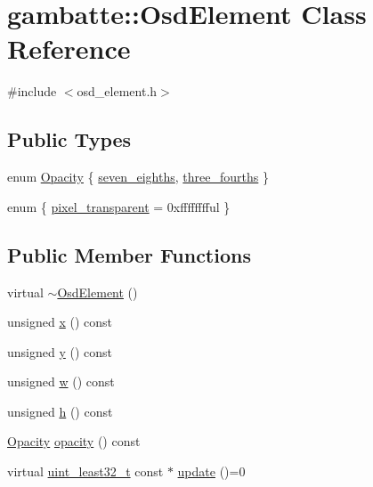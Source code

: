\hypertarget{classgambatte_1_1OsdElement}{}\section{gambatte\+:\+:Osd\+Element Class Reference}
\label{classgambatte_1_1OsdElement}


{\ttfamily \#include $<$osd\+\_\+element.\+h$>$}

\subsection*{Public Types}
\begin{DoxyCompactItemize}
\item 
enum \hyperlink{classgambatte_1_1OsdElement_a1e52ecfbc0d4337e1f2b38d6c4a97636}{Opacity} \{ \hyperlink{classgambatte_1_1OsdElement_a1e52ecfbc0d4337e1f2b38d6c4a97636a1f8c4eebdca1a18dff836db5d55de550}{seven\+\_\+eighths}, 
\hyperlink{classgambatte_1_1OsdElement_a1e52ecfbc0d4337e1f2b38d6c4a97636a167587e5da41c2d2d0da8e47bfd113f8}{three\+\_\+fourths}
 \}
\item 
enum \{ \hyperlink{classgambatte_1_1OsdElement_abac4885cdde352f8e7fa103b5ee55d9ba20e77644d4ab19a787a19b0e2653b6a8}{pixel\+\_\+transparent} = 0xfffffffful
 \}
\end{DoxyCompactItemize}
\subsection*{Public Member Functions}
\begin{DoxyCompactItemize}
\item 
virtual \hyperlink{classgambatte_1_1OsdElement_a39756e8cfb69dae634c0baaacdaa3796}{$\sim$\+Osd\+Element} ()
\item 
unsigned \hyperlink{classgambatte_1_1OsdElement_a76531a91472fdd9166a5536e1ff8f420}{x} () const
\item 
unsigned \hyperlink{classgambatte_1_1OsdElement_a5f0f2260752e7f2ebcc93b1007c5c0f7}{y} () const
\item 
unsigned \hyperlink{classgambatte_1_1OsdElement_ae7609268223e37561e634323cea5a467}{w} () const
\item 
unsigned \hyperlink{classgambatte_1_1OsdElement_a06b0891145ca9aac2d10cf9646681ce3}{h} () const
\item 
\hyperlink{classgambatte_1_1OsdElement_a1e52ecfbc0d4337e1f2b38d6c4a97636}{Opacity} \hyperlink{classgambatte_1_1OsdElement_a17774fcbd38501a675f3dfb616be23ad}{opacity} () const
\item 
virtual \hyperlink{namespacegambatte_a0639f09fccfbbd5a8e0796318768e370}{uint\+\_\+least32\+\_\+t} const  $\ast$ \hyperlink{classgambatte_1_1OsdElement_a75cb9f3e386bcb07a5a1acdb5a26996b}{update} ()=0
\end{DoxyCompactItemize}
